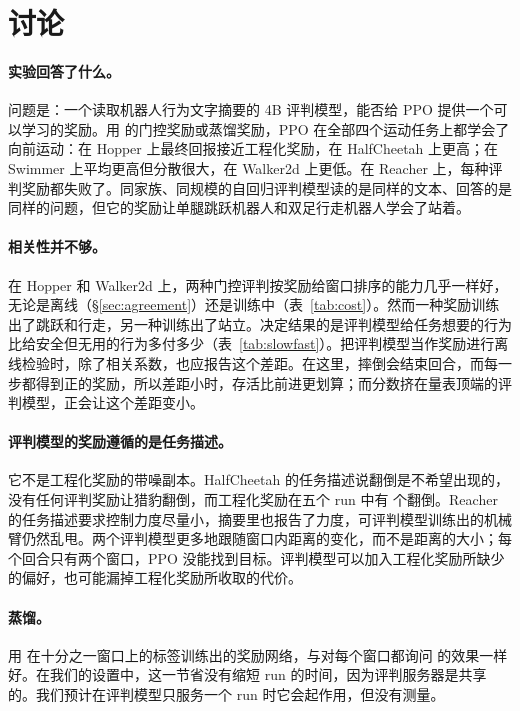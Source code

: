 
\section{讨论}\label{sec:discussion}

\paragraph{实验回答了什么。} 问题是：一个读取机器人行为文字摘要的 4B 评判模型，能否给 PPO 提供一个可以学习的奖励。用 \kev{} 的门控奖励或蒸馏奖励，PPO 在全部四个运动任务上都学会了向前运动：在 Hopper 上最终回报接近工程化奖励，在 HalfCheetah 上更高；在 Swimmer 上平均更高但分散很大，在 Walker2d 上更低。在 Reacher 上，每种评判奖励都失败了。同家族、同规模的自回归评判模型读的是同样的文本、回答的是同样的问题，但它的奖励让单腿跳跃机器人和双足行走机器人学会了站着。

\paragraph{相关性并不够。} 在 Hopper 和 Walker2d 上，两种门控评判按奖励给窗口排序的能力几乎一样好，无论是离线（\S\ref{sec:agreement}）还是训练中（表~\ref{tab:cost}）。然而一种奖励训练出了跳跃和行走，另一种训练出了站立。决定结果的是评判模型给任务想要的行为比给安全但无用的行为多付多少（表~\ref{tab:slowfast}）。把评判模型当作奖励进行离线检验时，除了相关系数，也应报告这个差距。在这里，摔倒会结束回合，而每一步都得到正的奖励，所以差距小时，存活比前进更划算；而分数挤在量表顶端的评判模型，正会让这个差距变小。

\paragraph{评判模型的奖励遵循的是任务描述。} 它不是工程化奖励的带噪副本。HalfCheetah 的任务描述说翻倒是不希望出现的，没有任何评判奖励让猎豹翻倒，而工程化奖励在五个 run 中有  个翻倒。Reacher 的任务描述要求控制力度尽量小，摘要里也报告了力度，可评判模型训练出的机械臂仍然乱甩。两个评判模型更多地跟随窗口内距离的变化，而不是距离的大小；每个回合只有两个窗口，PPO 没能找到目标。评判模型可以加入工程化奖励所缺少的偏好，也可能漏掉工程化奖励所收取的代价。

\paragraph{蒸馏。} 用 \kev{} 在十分之一窗口上的标签训练出的奖励网络，与对每个窗口都询问 \kev{} 的效果一样好。在我们的设置中，这一节省没有缩短 run 的时间，因为评判服务器是共享的。我们预计在评判模型只服务一个 run 时它会起作用，但没有测量。

